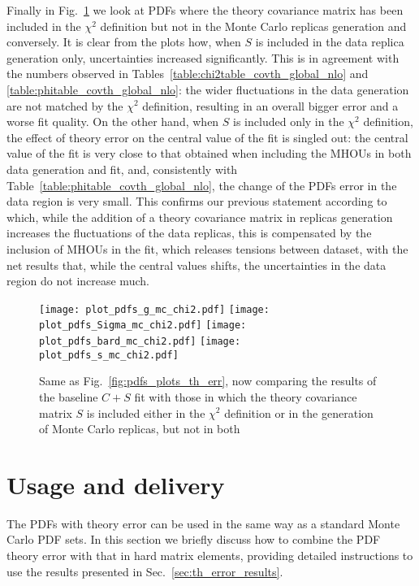     Finally in Fig.~\ref{fig:pdfs_plots_th_err_mc_chi2} we look at PDFs where the theory covariance matrix has been
    included in the $\chi^2$ definition but not in the Monte Carlo replicas generation and conversely.
    It is clear from the plots how, when $S$ is included in the data replica generation only, 
    uncertainties increased significantly. This is in agreement with the numbers observed in 
    Tables~\ref{table:chi2table_covth_global_nlo} and \ref{table:phitable_covth_global_nlo}: the wider fluctuations 
    in the data generation are not matched by the $\chi^2$ definition, resulting in an overall bigger error and a worse
    fit quality.
    On the other hand, when $S$ is included only in the $\chi^2$ definition, the effect of theory error on
    the central value of the fit is singled out: the central value of the fit is very close to that obtained 
    when including the MHOUs in both data generation and fit, and, consistently with Table~\ref{table:phitable_covth_global_nlo},
    the change of the PDFs error in the data region is very small.
    This confirms our previous statement according to which, while the addition of a theory covariance matrix
    in replicas generation increases the fluctuations of the data replicas, this is compensated by the inclusion of MHOUs
    in the fit, which releases tensions between dataset, with the net results that, while the central values shifts, 
    the uncertainties in the data region do not increase much.
    \begin{figure}[t!]
        \begin{center}
            \texttt{[image: plot\_pdfs\_g\_mc\_chi2.pdf]}
            \texttt{[image: plot\_pdfs\_Sigma\_mc\_chi2.pdf]}
            \texttt{[image: plot\_pdfs\_bard\_mc\_chi2.pdf]}
            \texttt{[image: plot\_pdfs\_s\_mc\_chi2.pdf]}
            \caption{Same as Fig.~\ref{fig:pdfs_plots_th_err}, now comparing the results of the baseline $C + S$
            fit with those in which the theory covariance matrix $S$ is included
            either in the $\chi^2$ definition or in the generation of Monte Carlo replicas, but not in both} 
            \label{fig:pdfs_plots_th_err_mc_chi2} 
        \end{center}
    \end{figure}

    \section{Usage and delivery}
    The PDFs with theory error can be used in the same way as a standard Monte Carlo PDF sets.
    In this section we briefly discuss how to combine the PDF theory error with that in hard matrix elements,
    providing detailed instructions to use the results presented in Sec.~\ref{sec:th_error_results}. 


